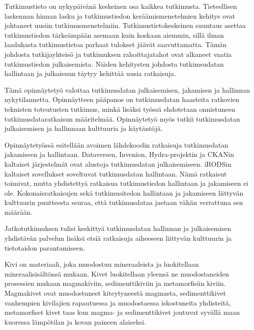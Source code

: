 Tutkimustieto on nykyp{\"a}iv{\"a}n{\"a} keskeinen osa kaikkea tutkimusta. Tieteellisen
laskennan hinnan lasku ja tutkimustiedon ker{\"a}{\"a}mismenetelmien kehitys ovat johtaneet
uusiin tutkimusmenetelmiin. Tutkimustietokeskeinen suuntaus asettaa
tutkimustiedon t{\"a}rke{\"a}mp{\"a}{\"a}n asemaan kuin koskaan aiemmin, sill{\"a} ilman
laadukasta tutkimustietoa parhaat tulokset j{\"a}{\"a}v{\"a}t saavuttamatta.
T{\"a}m{\"a}n johdosta tutkijayhteis{\"o} ja tutkimuksen rahoittajatahot ovat
alkaneet vaatia tutkimustiedon julkaisemista. N{\"a}iden kehitysten johdosta
tutkimsudatan hallintaan ja julkaisuun t{\"a}ytyy kehitt{\"a}{\"a} uusia ratkaisuja.

T{\"a}m{\"a} opinn{\"a}ytety{\"o} valottaa tutkimusdatan julkaisemisen, jakamisen ja
hallinnan nykytilannetta. Opinn{\"a}ytteen p{\"a}{\"a}panos on tutkimusdatan
haasteita ratkovien teknisten toteutusten tutkimus, mink{\"a} lis{\"a}ksi ty{\"o}ss{\"a}
ehdotetaan onnistuneen tutkimusdataratkaisun m{\"a}{\"a}ritelm{\"a}{\"a}. Opinn{\"a}ytety{\"o}
my{\"o}s tutkii tutkimusdatan julkaisemisen ja hallinnaan kulttuuria ja
k{\"a}yt{\"a}nt{\"o}j{\"a}.

Opinn{\"a}ytety{\"o}ss{\"a} esitell{\"a}{\"a}n avoimen l{\"a}hdekoodin ratkaisuja
tutkimusdatan jakamiseen ja hallintaan. Dataversen, Invenion, Hydra-projektin
ja CKANin kaltaiset j{\"a}rjestelm{\"a}t ovat alustoja tutkimusdatan julkaisemiseen.
iRODSin kaltaiset sovellukset soveltuvat tutkimusdatan hallintaan. N{\"a}m{\"a}
ratkaisut toimivat, mutta yhdistetty{\"a} ratkaisua tutkimustiedon hallintaan
ja jakamiseen ei ole. Kokonaisratkaisujen sek{\"a} tutkimusitedon
hallintaan ja jakamiseen liittyv{\"a}n kulttuurin puutteesta seuraa, ett{\"a}
tutkimusdataa jaetaan v{\"a}h{\"a}n verrattuna sen m{\"a}{\"a}r{\"a}{\"a}n.

Jatkotutkimuksen tulisi keskitty{\"a} tutkimusdatan hallinnan ja julkaisemisen
yhdist{\"a}v{\"a}n palvelun lis{\"a}ksi etsi{\"a} ratkaisuja aiheeseen liittyv{\"a}n kulttuurin ja
tietotaidon parantamiseen.

\iffalse
Kivi on materiaali, joka muodostuu mineraaleista ja luokitellaan
mineraalisis{\"a}lt{\"o}ns{\"a} mukaan. Kivet luokitellaan yleens{\"a} ne muodostaneiden
prosessien mukaan magmakiviin, sedimenttikiviin ja metamorfisiin kiviin.
Magmakivet ovat muodostuneet kiteytyneest{\"a} magmasta, sedimenttikivet vanhempien
kivilajien rapautuessa ja muodostaessa iskostuneita yhdisteit{\"a}, metamorfiset
kivet taas kun magma- ja sedimenttikivet joutuvat syv{\"a}ll{\"a} maan kuoressa
l{\"a}mp{\"o}tilan ja kovan paineen alaiseksi.


